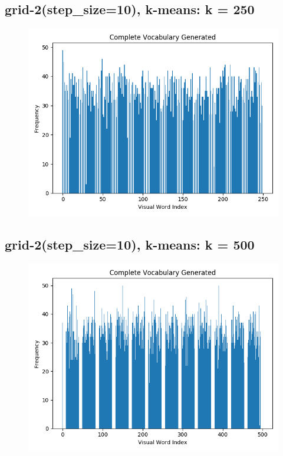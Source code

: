 \subsection*{grid-2(step\_size=10), k-means: k = 250}
\begin{figure}[H]
    \centering
    \includegraphics[width=\textwidth]{images/bow-stp-10-250.png}
\end{figure}

\subsection*{grid-2(step\_size=10), k-means: k = 500}
\begin{figure}[H]
    \centering
    \includegraphics[width=\textwidth]{images/bow-stp-10-500.png}
\end{figure}

